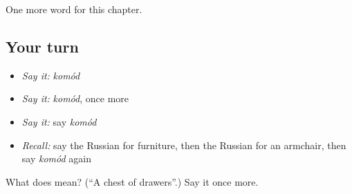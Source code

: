 \begin{grammarlens}[title={What you've built}]
One more word for this chapter.
\end{grammarlens}

\subsection*{Your turn}
\begin{itemize}
\raggedright
  \item \emph{Say it:} \emph{komód}
  \item \emph{Say it:} \emph{komód}, once more
  \item \emph{Say it:} say \emph{komód}
  \item \emph{Recall:} say the Russian for furniture, then the Russian for an armchair, then say \emph{komód} again
\end{itemize}

\begin{tcolorbox}[breakable,colback=teal!4,colframe=teal!35!black,title={Before you move on}]
What does  mean? (\textquotedblleft{}A chest of drawers\textquotedblright{}.) Say it once more.
\end{tcolorbox}
